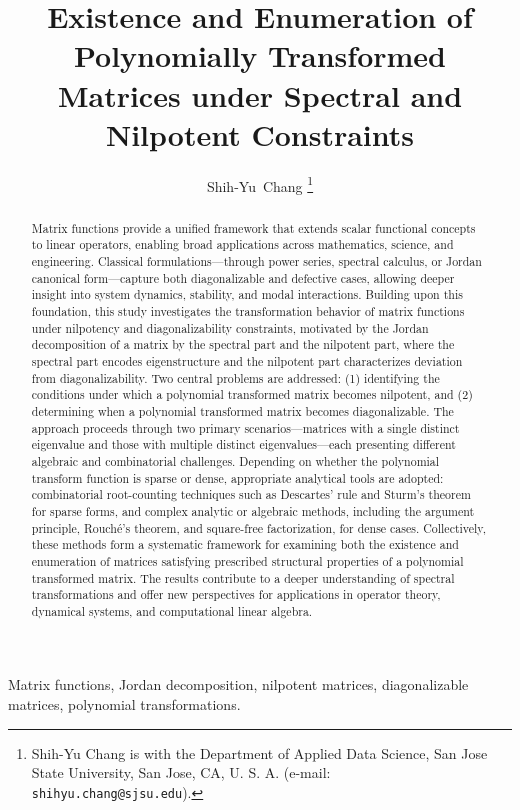 \documentclass[11pt]{article}
\begin{document}
\vspace{1cm}
\title{Existence and Enumeration of Polynomially Transformed Matrices under Spectral and Nilpotent Constraints}
\vspace{1.8cm}
\author{Shih-Yu~Chang
\thanks{Shih-Yu Chang is with the Department of Applied Data Science,
San Jose State University, San Jose, CA, U. S. A. (e-mail: {\tt
shihyu.chang@sjsu.edu}). 
           }}

\maketitle

\begin{abstract}
%
Matrix functions provide a unified framework that extends scalar functional concepts to linear operators, enabling broad applications across mathematics, science, and engineering. Classical formulations—through power series, spectral calculus, or Jordan canonical form—capture both diagonalizable and defective cases, allowing deeper insight into system dynamics, stability, and modal interactions. Building upon this foundation, this study investigates the transformation behavior of matrix functions under nilpotency and diagonalizability constraints, motivated by the Jordan decomposition of a matrix by the spectral part and the nilpotent part, where the spectral part  encodes eigenstructure and the nilpotent part characterizes deviation from diagonalizability. Two central problems are addressed: (1) identifying the conditions under which a polynomial transformed matrix becomes nilpotent, and (2) determining when a polynomial transformed matrix becomes diagonalizable. The approach proceeds through two primary scenarios—matrices with a single distinct eigenvalue and those with multiple distinct eigenvalues—each presenting different algebraic and combinatorial challenges. Depending on whether the polynomial transform function is sparse or dense, appropriate analytical tools are adopted: combinatorial root-counting techniques such as Descartes’ rule and Sturm’s theorem for sparse forms, and complex analytic or algebraic methods, including the argument principle, Rouché’s theorem, and square-free factorization, for dense cases. Collectively, these methods form a systematic framework for examining both the existence and enumeration of matrices satisfying prescribed structural properties of a polynomial transformed matrix. The results contribute to a deeper understanding of spectral transformations and offer new perspectives for applications in operator theory, dynamical systems, and computational linear algebra.
%
\end{abstract}
%
\begin{keywords}
Matrix functions, Jordan decomposition, nilpotent matrices, diagonalizable matrices, polynomial transformations.
\end{keywords}
\end{document}
